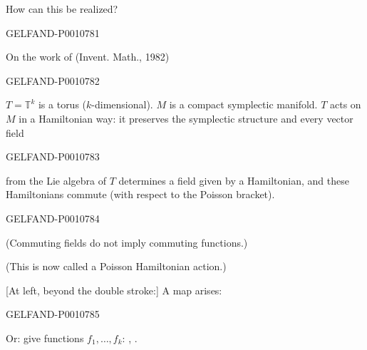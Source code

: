 How can this be realized?


\begin{GelfandAdjacentEvidence}{GELFAND-P001078}{1}

On the work of  (Invent. Math., 1982)
\end{GelfandAdjacentEvidence}
\begin{GelfandAdjacentEvidence}{GELFAND-P001078}{2}


$T=\mathbb T^k$ is a torus ($k$-dimensional). $M$ is a compact symplectic manifold.
$T$ acts on $M$ in a Hamiltonian way: it preserves the symplectic structure and every vector field
\end{GelfandAdjacentEvidence}
\begin{GelfandAdjacentEvidence}{GELFAND-P001078}{3}

from the Lie algebra of $T$ determines a field given by a Hamiltonian, and these Hamiltonians commute (with respect to the Poisson bracket).
\end{GelfandAdjacentEvidence}
\begin{GelfandAdjacentEvidence}{GELFAND-P001078}{4}


(Commuting fields do not imply commuting functions.)

(This is now called a Poisson Hamiltonian action.)

[At left, beyond the double stroke:] A map arises:
\end{GelfandAdjacentEvidence}
\begin{GelfandAdjacentEvidence}{GELFAND-P001078}{5}


Or: give functions $f_1,\ldots,f_k$: , .
\end{GelfandAdjacentEvidence}
